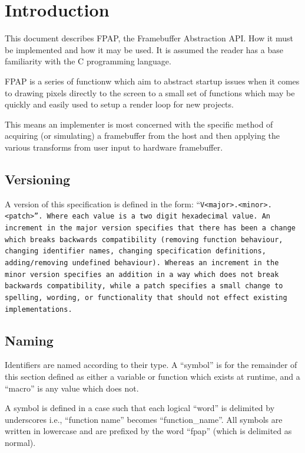\chapter{Introduction}

\noindent This document describes FPAP, the Framebuffer Abstraction API. How
it must be implemented and how it may be used. It is assumed the reader has
a base familiarity with the C programming language.

FPAP is a series of functionw which aim to abstract startup issues when it
comes to drawing pixels directly to the screen to a small set of functions
which may be quickly and easily used to setup a render loop for new projects.

This means an implementer is most concerned with the specific method of
acquiring (or simulating) a framebuffer from the host and then applying the
various transforms from user input to hardware framebuffer.

\section{Versioning}

\noindent A version of this specification is defined in the form:
``\tt V<major>.<minor>.<patch>\rm''. Where each value is a two digit hexadecimal
value. An increment in the major version specifies that there has been a
change which breaks backwards compatibility (removing function behaviour,
changing identifier names, changing specification definitions, adding/removing
undefined behaviour). Whereas an increment in the minor version specifies an
addition in a way which does not break backwards compatibility, while a patch
specifies a small change to spelling, wording, or functionality that should
not effect existing implementations.

\section{Naming}

\noindent Identifiers are named according to their type. A ``symbol'' is for
the remainder of this section defined as either a variable or function which
exists at runtime, and a ``macro'' is any value which does not.

A symbol is defined in a case such that each logical ``word'' is delimited by
underscores i.e., ``function name'' becomes ``function\_name''. All symbols are
written in lowercase and are prefixed by the word ``fpap'' (which is delimited
as normal).

